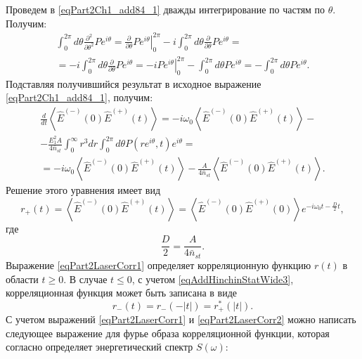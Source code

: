 Проведем в \eqref{eqPart2Ch1_add84_1} дважды интегрирование по частям
по $\theta$. Получим:
\begin{eqnarray}
\int_0^{2 \pi}
d \theta
\frac{\partial^2}{\partial \theta^2}P e^{i \theta} = 
\left.\frac{\partial}{\partial \theta}P e^{i \theta}\right|_0^{2 \pi}
- 
i \int_0^{2 \pi}
d \theta
\frac{\partial}{\partial \theta}P e^{i \theta} = 
\nonumber \\
= - i \int_0^{2 \pi}
d \theta
\frac{\partial}{\partial \theta}P e^{i \theta}  
= 
- i \left.P e^{i \theta}\right|_0^{2 \pi}
-
\int_0^{2 \pi}
d \theta
P e^{i \theta} = 
- \int_0^{2 \pi}
d \theta
P e^{i \theta}.
\nonumber
\end{eqnarray}
Подставляя получившийся результат в исходное выражение
\eqref{eqPart2Ch1_add84_1}, получим:
\begin{eqnarray}
\frac{d}{dt}\left<\hat{E}^{(-)}\left(0\right)\hat{E}^{(+)}\left(t\right)\right>
=
-i \omega_0
\left<\hat{E}^{(-)}\left(0\right)\hat{E}^{(+)}\left(t\right)\right>-
\nonumber \\
-
\frac{E_1^2 A}{4 \bar{n}_{st}} 
\int_0^{\infty}r^3 d r 
\int_0^{2 \pi}
d \theta
P\left(r
e^{i \theta}, t\right) e^{i \theta} = 
\nonumber \\
=-i \omega_0
\left<\hat{E}^{(-)}\left(0\right)\hat{E}^{(+)}\left(t\right)\right> -
\frac{A}{4 \bar{n}_{st}}\left<\hat{E}^{(-)}\left(0\right)\hat{E}^{(+)}\left(t\right)\right>.
\nonumber
\end{eqnarray}
Решение этого уравнения имеет вид
\begin{equation}
r_{+}\left(t\right) = \left<\hat{E}^{(-)}\left(0\right)\hat{E}^{(+)}\left(t\right)\right> =
\left<\hat{E}^{(-)}\left(0\right)\hat{E}^{(+)}\left(0\right)\right>
e^{-i \omega_0 t - \frac{D}{2}t},
\label{eqPart2LaserCorr1}
\end{equation}
где
\[
\frac{D}{2} = \frac{A}{4 \bar{n}_{st}}.
\]
Выражение \eqref{eqPart2LaserCorr1} определяет корреляционную функцию
$r\left(t\right)$ в области $t \ge 0$. В случае $t \le 0$, с учетом
\eqref{eqAddHinchinStatWide3}, корреляционная функция может быть
записана в виде  
\begin{equation}
r_{-}\left(t\right) = r_{-}\left(-\left|t\right|\right) =
r_{+}^{*}\left(\left|t\right|\right). 
\label{eqPart2LaserCorr2}
\end{equation}
С учетом выражений \eqref{eqPart2LaserCorr1} и
\eqref{eqPart2LaserCorr2} можно написать следующее выражение для фурье
образа корреляционной функции, которая согласно 
определяет энергетический спектр $S\left(\omega\right)$:
